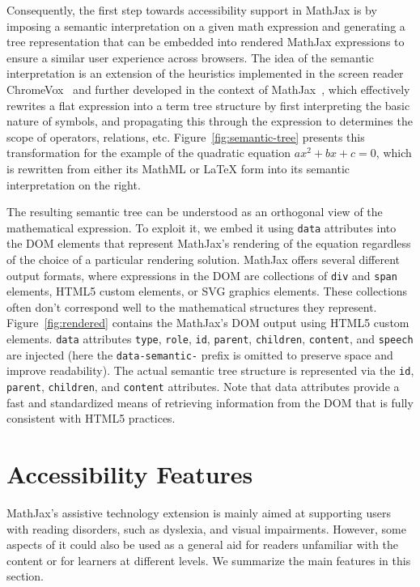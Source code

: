 \documentclass{sig-alternate}
\begin{document}
Consequently, the first step towards accessibility support in MathJax is by
imposing a semantic interpretation on a given math expression and generating a
tree representation that can be embedded into rendered MathJax expressions to
ensure a similar user experience across browsers. The idea of the semantic
interpretation is an extension of the heuristics implemented in the screen
reader ChromeVox~\cite{Sorge14} and further developed in the context of
MathJax~\cite{cervone2016towards}, which effectively rewrites a flat expression
into a term tree structure by first interpreting the basic nature of symbols, and
propagating this through the expression to determines the scope of operators,
relations, etc. Figure~\ref{fig:semantic-tree} presents this transformation for
the example of the quadratic equation $ax^2 + bx + c = 0$, which is rewritten
from either its MathML or {\LaTeX} form into its semantic interpretation on the
right.

The resulting semantic tree can be understood as an orthogonal view of the
mathematical expression. To exploit it, we embed it using \texttt{data}
attributes into the DOM elements that represent MathJax's rendering of the
equation regardless of the choice of a particular rendering solution. MathJax
offers several different output formats, where expressions in the DOM are
collections of \texttt{div} and \texttt{span} elements, HTML5 custom elements,
or SVG graphics elements. These collections often don't correspond well to the
mathematical structures they represent.  Figure~\ref{fig:rendered} contains the
MathJax's DOM output using HTML5 custom elements. \texttt{data} attributes
\texttt{type}, \texttt{role}, \texttt{id}, \texttt{parent}, \texttt{children},
\texttt{content}, and \texttt{speech} are injected (here the
\texttt{data-semantic-} prefix is omitted to preserve space and improve
readability). The actual semantic tree structure is represented via the
\texttt{id}, \texttt{parent}, \texttt{children}, and \texttt{content}
attributes. Note that data attributes provide a fast and standardized means of
retrieving information from the DOM that is fully consistent with HTML5
practices.


\section{Accessibility Features}
\label{sec:at-solution}

MathJax's assistive technology extension is mainly aimed at supporting users
with reading disorders, such as dyslexia, and visual impairments. However, some
aspects of it could also be used as a general aid for readers unfamiliar with
the content or for learners at different levels. We summarize the main features
in this section.
\end{document}

